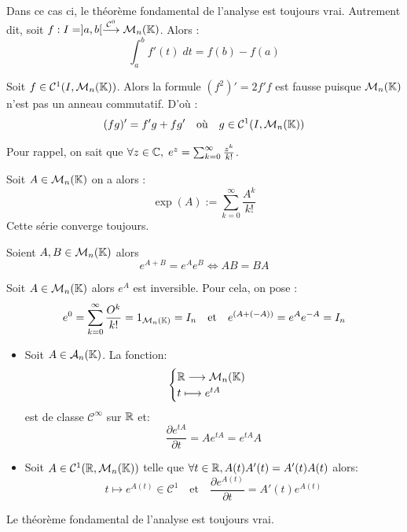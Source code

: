 \begin{prop}
    Dans ce cas ci, le théorème fondamental de l'analyse est toujours vrai. 
    Autrement dit, soit $f : I = ]a,b[ \overset{ \mathcal{C}^0}{\longrightarrow} \mathcal{M}_n(\mathbb{K})$. 
    Alors : 
        \[ \int_{a}^{b} f'(t) \; dt = f(b) - f(a) \] 
\end{prop}

\begin{remark}
    Soit $f \in \mathcal{C}^1(I, \mathcal{M}_n(\mathbb{K}))$. Alors la formule $(f^2)' = 2f'f$ est fausse 
    puisque $\mathcal{M}_n(\mathbb{K})$ n'est pas un anneau commutatif. D'où : 
        \[ (fg)' = f'g + fg' \quad \text{où} \quad g \in \mathcal{C}^1(I, \mathcal{M}_n(\mathbb{K})) \] 
\end{remark}

\begin{remark}
    Pour rappel, on sait que $ \forall z \in \mathbb{C}, \; e^z = \sum_{k=0}^{\infty} \frac{z^k}{k!}$. 
\end{remark}

\begin{definition}
    Soit $A \in \mathcal{M}_n(\mathbb{K})$ on a alors :
        \[ \exp(A) := \sum_{k=0}^{\infty} \frac{A^k}{k!} \]
    Cette série converge toujours. 
\end{definition}

\begin{proposition}
    Soient $A,B \in \mathcal{M}_n(\mathbb{K})$ alors 
        \[ e^{A+B} = e^A e^B \iff AB = BA \] 
\end{proposition}

\begin{proposition}[Inverse]
    Soit $A \in \mathcal{M}_n(\mathbb{K})$ alors $e^A$ est inversible. 
    Pour cela, on pose :
    \[ e^0 = \sum_{k=0}^{\infty} \frac{O^k}{k!} = 1_{\mathcal{M}_n(\mathbb{K})} = I_n \quad \text{et} \quad e^{(A+ (-A))} = e^A e^{-A} = I_n \] 
\end{proposition}

\begin{prop} 
		\begin{itemize} 
			\item Soit $A \in \mathcal{A}_n(\mathbb{K})$. La fonction:
			\[ 
				\begin{cases} 
					\mathbb{R} \longrightarrow \mathcal{M}_n(\mathbb{K}) \\ 
					t \longmapsto e^{tA} 
				\end{cases}
			\]
			est de classe $ \mathcal{C}^\infty$ sur $\mathbb{R}$ et: 
					\[ \boxed{ \frac{\partial e^{tA}}{\partial t} = A e^{tA} = e^{tA} A } \]
			\item Soit $A \in \mathcal{C}^1(\mathbb{R}, \mathcal{M}_n(\mathbb{K}))$ telle que 
			$ \forall t \in \mathbb{R}, A(t)A'(t) = A'(t) A(t)$  alors: 
				\[ t \longmapsto e^{A(t)} \in \mathcal{C}^1 \quad \text{et} \quad \frac{\partial e^{A(t)}}{\partial t} = A'(t)e^{A(t)} \]
		\end{itemize}
		Le théorème fondamental de l'analyse est toujours vrai. 
\end{prop}

